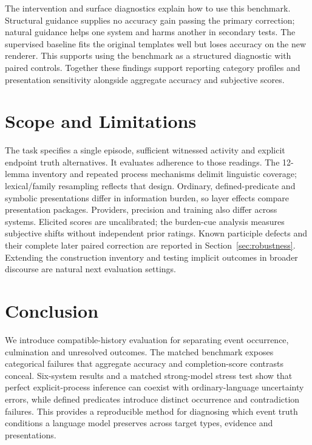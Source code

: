 \documentclass[sigconf,anonymous,review]{acmart}
\begin{document}
The intervention and surface diagnostics explain how to use this benchmark. Structural guidance supplies no accuracy gain passing the primary correction; natural guidance helps one system and harms another in secondary tests. The supervised baseline fits the original templates well but loses accuracy on the new renderer. This supports using the benchmark as a structured diagnostic with paired controls. Together these findings support reporting category profiles and presentation sensitivity alongside aggregate accuracy and subjective scores.

\balance
\section{Scope and Limitations}
The task specifies a single episode, sufficient witnessed activity and explicit endpoint truth alternatives. It evaluates adherence to those readings. The 12-lemma inventory and repeated process mechanisms delimit linguistic coverage; lexical/family resampling reflects that design. Ordinary, defined-predicate and symbolic presentations differ in information burden, so layer effects compare presentation packages. Providers, precision and training also differ across systems. Elicited scores are uncalibrated; the burden-cue analysis measures subjective shifts without independent prior ratings. Known participle defects and their complete later paired correction are reported in Section~\ref{sec:robustness}. Extending the construction inventory and testing implicit outcomes in broader discourse are natural next evaluation settings.

\section{Conclusion}
We introduce compatible-history evaluation for separating event occurrence, culmination and unresolved outcomes. The matched benchmark exposes categorical failures that aggregate accuracy and completion-score contrasts conceal. Six-system results and a matched strong-model stress test show that perfect explicit-process inference can coexist with ordinary-language uncertainty errors, while defined predicates introduce distinct occurrence and contradiction failures. This provides a reproducible method for diagnosing which event truth conditions a language model preserves across target types, evidence and presentations.
\end{document}
